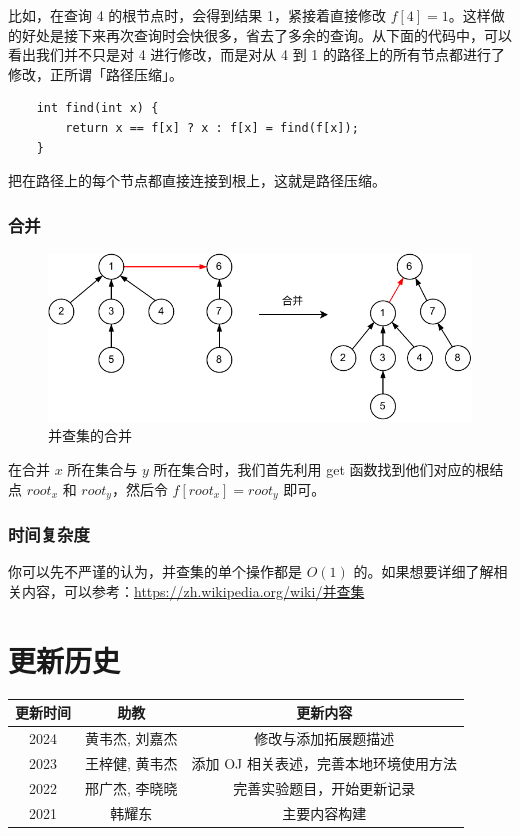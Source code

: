 \documentclass[12pt,a4paper]{article}
\begin{document}
比如，在查询 4 的根节点时，会得到结果 1，紧接着直接修改 $f[4] = 1$。这样做的好处是接下来再次查询时会快很多，省去了多余的查询。从下面的代码中，可以看出我们并不只是对 4 进行修改，而是对从 4 到 1 的路径上的所有节点都进行了修改，正所谓「路径压缩」。

\begin{lstlisting}
    int find(int x) {
        return x == f[x] ? x : f[x] = find(f[x]);
    }
\end{lstlisting}

把在路径上的每个节点都直接连接到根上，这就是路径压缩。

\subsubsection{合并}

\begin{figure}[h]
    \centering
    \includegraphics{img/lab6/并查集_union.pdf}
    \caption{并查集的合并}
    \label{fig:uf_union}
\end{figure}

在合并 $x$ 所在集合与 $y$ 所在集合时，我们首先利用 get 函数找到他们对应的根结点 $\textit{root}_x$ 和 $\textit{root}_y$，然后令 $f[\textit{root}_x] = \textit{root}_y$ 即可。

\subsubsection{时间复杂度}

你可以先不严谨的认为，并查集的单个操作都是 $O(1)$ 的。如果想要详细了解相关内容，可以参考：\href{https://zh.wikipedia.org/wiki/并查集}{https://zh.wikipedia.org/wiki/并查集}

\section*{更新历史}

\begin{center}
    \begin{tabular}{|c|c|c|}
        \hline
        \textbf{更新时间} & \textbf{助教} & \textbf{更新内容} \\
        \hline
        2024 & 黄韦杰, 刘嘉杰 & 修改与添加拓展题描述\\
        2023 & 王梓健, 黄韦杰 & 添加 OJ 相关表述，完善本地环境使用方法 \\
        2022 & 邢广杰, 李晓晓 & 完善实验题目，开始更新记录 \\
        2021 & 韩耀东 & 主要内容构建 \\
        \hline
        \end{tabular}
\end{center}
\end{document}
